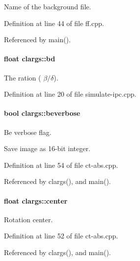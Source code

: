 Name of the background file. 



Definition at line 44 of file ff.cpp.



Referenced by main().

\hypertarget{structclargs_a5f8c41d1199e9bca822a47bc18759648}{
\paragraph[{bd}]{\setlength{\rightskip}{0pt plus 5cm}float {\bf clargs::bd}}\hfill}
\label{structclargs_a5f8c41d1199e9bca822a47bc18759648}


The ration ( $\beta/\delta$). 



Definition at line 20 of file simulate-\/ipc.cpp.

\hypertarget{structclargs_accb8bf7e8a4a9d0829bc01e714adb2cb}{
\paragraph[{beverbose}]{\setlength{\rightskip}{0pt plus 5cm}bool {\bf clargs::beverbose}}\hfill}
\label{structclargs_accb8bf7e8a4a9d0829bc01e714adb2cb}


Be verbose flag. 

Save image as 16-\/bit integer. 

Definition at line 54 of file ct-\/abs.cpp.



Referenced by clargs(), and main().

\hypertarget{structclargs_a754006a265d07d01ba9333ad6f0624d5}{
\paragraph[{center}]{\setlength{\rightskip}{0pt plus 5cm}float {\bf clargs::center}}\hfill}
\label{structclargs_a754006a265d07d01ba9333ad6f0624d5}


Rotation center. 



Definition at line 52 of file ct-\/abs.cpp.



Referenced by clargs(), and main().

